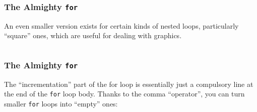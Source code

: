 \documentclass[handout,xcolor]{beamer}
\begin{document}
\begin{frame}
	\frametitle{The Almighty \texttt{for}}
	\pause
	
	An even smaller version exists for certain kinds of nested loops, particularly ``square'' ones, which are useful for dealing with graphics.
	\pause
	
	\begin{columns}
		\begin{column}{0.45\textwidth}
			\centering
			
		\end{column}
		\pause
		\begin{column}{0.45\textwidth}
			\centering
			
		\end{column}
	\end{columns}
\end{frame}

\begin{frame}
	\frametitle{The Almighty \texttt{for}}
	\pause
	
	The ``incrementation'' part of the for loop is essentially just a compulsory line at the end of the \texttt{for} loop body. Thanks to the comma ``operator'', you can turn smaller \texttt{for} loops into ``empty'' ones:
	\pause
	
	\begin{columns}
		\begin{column}{0.45\textwidth}
			\centering
			
		\end{column}
		\pause
		\begin{column}{0.45\textwidth}
			\centering
			
		\end{column}
	\end{columns}
\end{frame}
\end{document}
